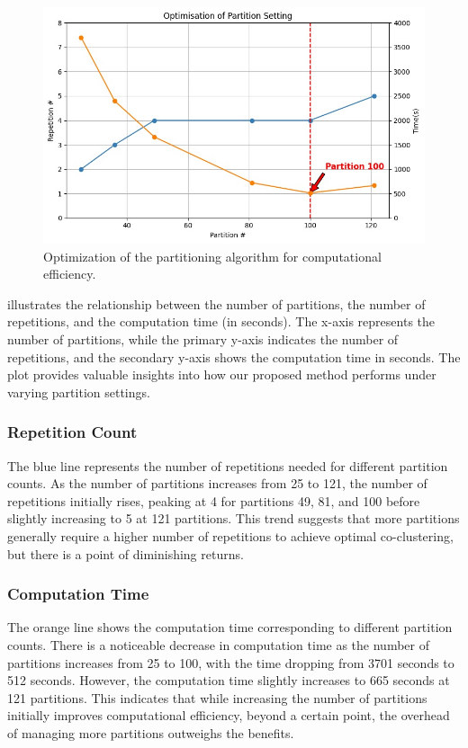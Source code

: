 \documentclass[journal]{IEEEtran}
\begin{document}
\begin{figure}[htbp]
  \centering
  \includegraphics[width=0.8\linewidth]{optimisation.jpg}
  \caption{Optimization of the partitioning algorithm for computational efficiency.}
  \label{fig:optimisation}
\end{figure}

 illustrates the relationship between the number of partitions, the number of repetitions, and the computation time (in seconds). The x-axis represents the number of partitions, while the primary y-axis indicates the number of repetitions, and the secondary y-axis shows the computation time in seconds. The plot provides valuable insights into how our proposed method performs under varying partition settings.

\subsubsection{Repetition Count}
The blue line represents the number of repetitions needed for different partition counts. As the number of partitions increases from 25 to 121, the number of repetitions initially rises, peaking at 4 for partitions 49, 81, and 100 before slightly increasing to 5 at 121 partitions. This trend suggests that more partitions generally require a higher number of repetitions to achieve optimal co-clustering, but there is a point of diminishing returns.

\subsubsection{Computation Time}
The orange line shows the computation time corresponding to different partition counts. There is a noticeable decrease in computation time as the number of partitions increases from 25 to 100, with the time dropping from 3701 seconds to 512 seconds. However, the computation time slightly increases to 665 seconds at 121 partitions. This indicates that while increasing the number of partitions initially improves computational efficiency, beyond a certain point, the overhead of managing more partitions outweighs the benefits.
\end{document}
